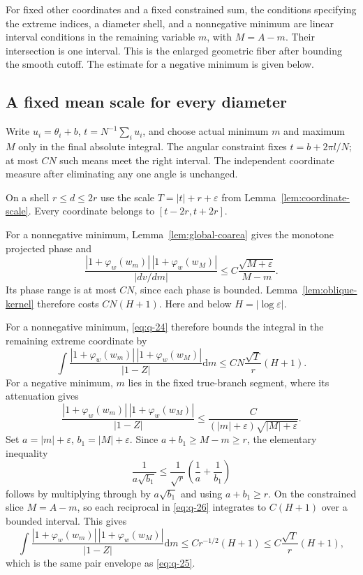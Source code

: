\documentclass[11pt]{article}
\numberwithin{equation}{section}
\theoremstyle{remark}\newtheorem{remark}[theorem]{Remark}
\newcommand{\dd}{\mathrm d}
\begin{document}
For fixed other coordinates and a fixed constrained sum,
the conditions specifying the extreme indices, a diameter
shell, and a nonnegative minimum are linear interval conditions
in the remaining variable $m$, with $M=A-m$.
Their intersection is one interval. This is the enlarged geometric
fiber after bounding the smooth cutoff. The estimate for a negative
minimum is given below.

\subsection{A fixed mean scale for every diameter}


Write $u_i=\theta_i+b$, $t=N^{-1}\sum_i u_i$, and choose actual
minimum $m$ and maximum $M$ only in the final absolute integral.
The angular constraint fixes $t=b+2\pi l/N$; at most $CN$ such means
meet the right interval. The independent coordinate measure after
eliminating any one angle is unchanged.

On a shell $r\le d\le2r$ use the scale
$T=|t|+r+\varepsilon$ from Lemma~\ref{lem:coordinate-scale}.
Every coordinate belongs to $[t-2r,t+2r]$.

For a nonnegative minimum, Lemma~\ref{lem:global-coarea}
gives the monotone projected phase and
\begin{equation}\label{eq:q-24}
 \frac{|1+\varphi_w(w_m)|\,|1+\varphi_w(w_M)|}
 {|dv/dm|}\le C\frac{\sqrt{M+\varepsilon}}{M-m}.
\end{equation}
Its phase range is at most $CN$, since each phase is bounded.
Lemma~\ref{lem:oblique-kernel} therefore costs $CN(H+1)$.
Here and below $H=|\log\varepsilon|$.

For a nonnegative minimum, \eqref{eq:q-24} therefore bounds the integral in
the remaining extreme coordinate by
\begin{equation}\label{eq:q-25}
\int \frac{|1+\varphi_w(w_m)|\,|1+\varphi_w(w_M)|}{|1-Z|}\dd m
       \le CN\frac{\sqrt T}{r}(H+1).
\end{equation}
For a negative minimum, $m$ lies in the fixed true-branch segment,
where its attenuation gives
\[
 \frac{|1+\varphi_w(w_m)|\,|1+\varphi_w(w_M)|}{|1-Z|}
 \le \frac{C}{(|m|+\varepsilon)\sqrt{|M|+\varepsilon}}.
\]
Set $a=|m|+\varepsilon$, $b_1=|M|+\varepsilon$. Since
$a+b_1\ge M-m\ge r$, the elementary inequality
\begin{equation}\label{eq:q-26}
\frac1{a\sqrt{b_1}}
 \le \frac1{\sqrt r}\left(\frac1a+\frac1{b_1}\right)
\end{equation}
follows by multiplying through by $a\sqrt{b_1}$ and using
$a+b_1\ge r$. On the constrained slice $M=A-m$, so each reciprocal
in \eqref{eq:q-26} integrates to $C(H+1)$ over a bounded interval. This gives
\begin{equation}\label{eq:q-27}
\int \frac{|1+\varphi_w(w_m)|\,|1+\varphi_w(w_M)|}{|1-Z|}\dd m
 \le Cr^{-1/2}(H+1)\le C\frac{\sqrt T}{r}(H+1),
\end{equation}
which is the same pair envelope as \eqref{eq:q-25}. 
\end{document}
